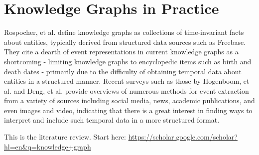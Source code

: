 \section{Knowledge Graphs in Practice}
Rospocher, et al. define knowledge graphs as collections of time-invariant facts about entities, typically derived from structured data sources such as Freebase. They cite a dearth of event representations in current knowledge graphs as a shortcoming - limiting knowledge graphs to encyclopedic items such as birth and death dates - primarily due to the difficulty of obtaining temporal data about entities in a structured manner. Recent surveys such as those by Hogenboom, et al. and Deng, et al. provide overviews of numerous methods for event extraction from a variety of sources including social media, news, academic publications, and even images and video, indicating that there is a great interest in finding ways to interpret and include such temporal data in a more structured format.

This is the literature review. Start here: \url{https://scholar.google.com/scholar?hl=en&q=knowledge+graph}